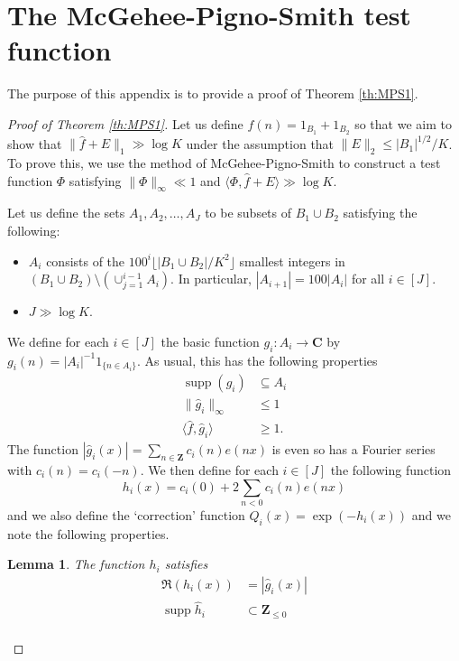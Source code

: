 \documentclass[11pt, reqno]{amsart}
\newtheorem{lemma}[theorem]{Lemma}
\DeclareMathOperator\supp{supp}
\begin{document}
\section{The McGehee-Pigno-Smith test function}
The purpose of this appendix is to provide a proof of Theorem \ref{th:MPS1}. 
\begin{proof}[Proof of Theorem \ref{th:MPS1}]
    Let us define $f(n)=1_{B_1}+1_{B_2}$ so that we aim to show that $\lVert \hat{f}+E\rVert_1\gg \log K$ under the assumption that $\lVert E\rVert_2\leqslant |B_1|^{1/2}/K$. To prove this, we use the method of McGehee-Pigno-Smith to construct a test function $\Phi$ satisfying $\lVert \Phi\rVert_\infty \ll 1$ and $\langle \Phi, \hat{f}+E\rangle\gg \log K$.

    \medskip
    
Let us define the sets $A_1,A_2,\dots,A_J$ to be subsets of $B_1\cup B_2$ satisfying the following:
    \begin{itemize}
        \item $A_i$ consists of the $100^i\lfloor|B_1\cup B_2|/K^2\rfloor$ smallest integers in $(B_1\cup B_2)\setminus\left(\cup_{j=1}^{i-1}A_i\right)$. In particular, $|A_{i+1}|=100|A_{i}|$ for all $i\in [J]$.
        \item $J\gg \log K$.
    \end{itemize}
    We define for each $i\in [J]$ the basic function $g_i:A_i\to\mathbf{C}$ by $g_i(n)=|A_i|^{-1}1_{\{n\in A_i\}}$. As usual, this has the following properties
\begin{align}
    \supp(g_i)&\subseteq A_i\label{eq:inneprod}\\
    \lVert \hat{g}_i\rVert_\infty&\leqslant 1\nonumber\\
    \langle \hat{f},\hat{g}_i\rangle &\geqslant 1\nonumber.    
\end{align}
The function $|\hat{g}_i(x)|=\sum_{n\in\mathbf{Z}}c_i(n)e(nx)$ is even so has a Fourier series with $c_i(n)=c_i(-n)$. We then define for each $i\in [J]$ the following function
\begin{equation*}
    h_i(x)=c_i(0)+2\sum_{n<0}c_i(n)e(nx)
\end{equation*}
and we also define the `correction' function $Q_i(x)=\exp(-h_i(x))$ and we note the following properties.
\begin{lemma}\label{lem:correction}
    The function $h_i$ satisfies
    \begin{align*}
        \Re \left(h_i(x)\right)&= |\hat{g}_i(x)|\\
        \supp \hat{h}_i&\subset \mathbf{Z}_{\leqslant 0}\\

\end{align*}
\end{lemma}
\end{proof}
\end{document}
